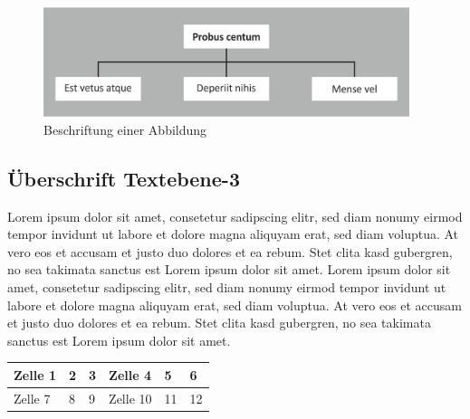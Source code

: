\begin{figure}[!h]
	\includegraphics[width=10.7cm]{pics/Abb-001.jpg}
	\caption{Beschriftung einer Abbildung}
	\label{Abb-001}
\end{figure}

\subsection{Überschrift Textebene-3}

Lorem ipsum dolor sit amet, consetetur sadipscing elitr, sed diam nonumy eirmod tempor invidunt ut labore et dolore magna aliquyam erat, sed diam voluptua. At vero eos et accusam et justo duo dolores et ea rebum. Stet clita kasd gubergren, no sea takimata sanctus est Lorem ipsum dolor sit amet. Lorem ipsum dolor sit amet, consetetur sadipscing elitr, sed diam nonumy eirmod tempor invidunt ut labore et dolore magna aliquyam erat, sed diam voluptua. At vero eos et accusam et justo duo dolores et ea rebum. Stet clita kasd gubergren, no sea takimata sanctus est Lorem ipsum dolor sit amet.

\begin{table}
	\begin{tabulary}{10.7cm}{|L|L|L|L|L|L|} %
		\hline
		Zelle 1 & 2	& 3 & Zelle 4 & 5 & 6\\
		\hline
		Zelle 7	& 8	& 9 & Zelle 10 & 11 & 12\\
		\hline
	\end{tabulary}
\end{table}







